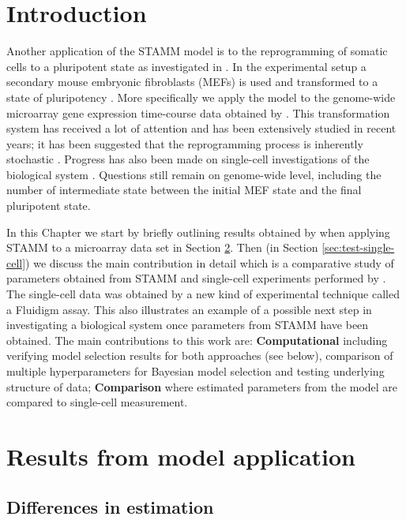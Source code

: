 \section{Introduction}
\label{sec:introduction-rep}

Another application of the STAMM model is to the reprogramming of somatic cells to a pluripotent state as investigated in \cite{Armond:2013}. In the experimental setup a secondary mouse embryonic fibroblasts (MEFs) is used and transformed to a state of pluripotency \citep{Takahashi:2006hi,Jaenisch:2008cz}. More specifically we apply the model to the genome-wide microarray gene expression time-course data obtained by \cite{SamavarchiTehrani:2010cp}. This transformation system has received a lot of attention and has been extensively studied in recent years; it has been suggested that the reprogramming process is inherently stochastic \citep{Hanna:2009ix}. Progress has also been made on single-cell investigations of the biological system \citep{Buganim:2012hp}. Questions still remain on genome-wide level, including the number of intermediate state between the initial MEF state and the final pluripotent state.

In this Chapter we start by briefly outlining results obtained by \cite{Armond:2013} when applying STAMM to a microarray data set in Section \ref{sec:iPsc-results}. Then (in Section \ref{sec:test-single-cell}) we discuss the main contribution in detail which is a comparative study of parameters obtained from STAMM and single-cell experiments performed by \cite{Buganim:2012hp}. The single-cell data was obtained by a new kind of experimental technique called a Fluidigm assay. This also illustrates an example of a possible next step in investigating a biological system once parameters from STAMM have been obtained. The main contributions to this work are: {\bf Computational} including verifying model selection results for both approaches (see below), comparison of multiple hyperparameters for Bayesian model selection and testing underlying structure of data; {\bf Comparison} where estimated parameters from the model are compared to single-cell measurement.

\section{Results from model application}
\label{sec:iPsc-results}

\subsection{Differences in estimation}
\label{sec:diff-estim}

